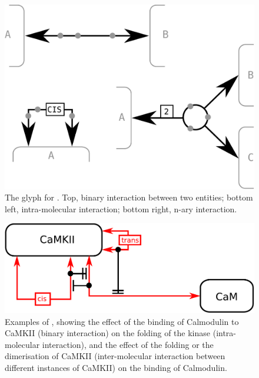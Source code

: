 \begin{figure}[H]
  \centering
  \includegraphics[scale = 0.3]{images/interaction}
  \caption{The \ER glyph for . Top, binary interaction between two entities; bottom left, intra-molecular interaction; bottom right, n-ary interaction.}
  \label{fig:interaction}
\end{figure}

\begin{figure}[H]
  \centering
  \includegraphics[scale = 0.5]{examples/ex-interaction}
  \caption{Examples of , showing the effect of the binding of Calmodulin to CaMKII (binary interaction) on the folding of the kinase (intra-molecular interaction), and the effect of the folding or the dimerisation of CaMKII (inter-molecular interaction between different instances of CaMKII) on the binding of Calmodulin.}
  \label{fig:ex-interaction}
\end{figure}


\normalcolor